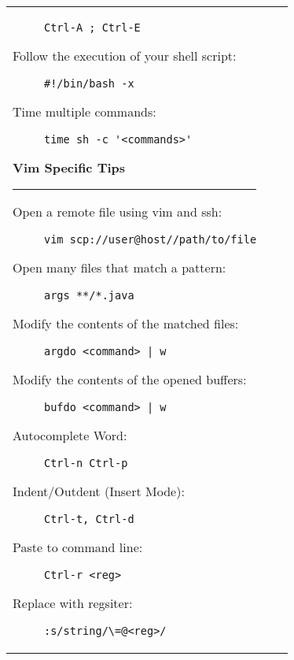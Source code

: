 \documentclass[landscape]{article}
\begin{document}
\begin{tabular*}{10.5in}{|p{2.9in}|p{2.9in}|p{2.9in}|}
\begin{flushleft}
\begin{description}
                {\verb!Ctrl-A ; Ctrl-E!}
            \item[Follow the execution of your shell script:]
                {\verb|#!/bin/bash -x|}
            \item[Time multiple commands:]
                {\verb!time sh -c '<commands>'!}
        \end{description}
        \textbf{\large{Vim Specific Tips}}
        \rule{2.9in}{.5pt}
        \small
        \begin{description}
            \item[Open a remote file using vim and ssh:]
                {\verb!vim scp://user@host//path/to/file!}
            \item[Open many files that match a pattern:]
                {\verb!args **/*.java!}
            \item[Modify the contents of the matched files:]
                {\verb!argdo <command> | w!}
            \item[Modify the contents of the opened buffers:]
                {\verb!bufdo <command> | w!}
            \item[Autocomplete Word:]
                {\verb!Ctrl-n Ctrl-p!}
            \item[Indent/Outdent (Insert Mode):]
                {\verb!Ctrl-t, Ctrl-d!}
            \item[Paste to command line:]
                {\verb!Ctrl-r <reg>!}
            \item[Replace with regsiter:]
                {\verb!:s/string/\=@<reg>/!}
        \end{description}
    \end{flushleft}
\end{tabular*}
\end{document}
